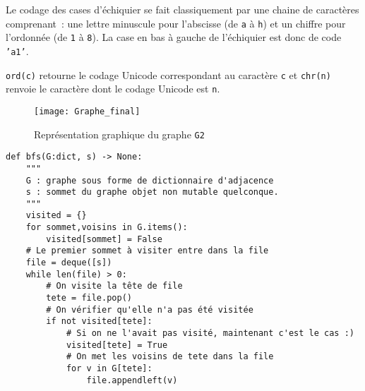 
Le codage des cases d'échiquier se fait classiquement par une chaine de caractères comprenant~: une lettre minuscule pour l'abscisse (de \texttt{a} à \texttt{h}) et un chiffre pour l'ordonnée (de \texttt{1} à \texttt{8}). La case en bas à gauche de l'échiquier est donc de code \texttt{'a1'}.

\begin{rem}
	\texttt{ord(c)} retourne le codage Unicode correspondant au caractère \texttt{c} et \texttt{chr(n)} renvoie le caractère dont le codage Unicode est \texttt{n}. 
\end{rem} 





\begin{figure}[h]
	\begin{center}
		\texttt{[image: Graphe\_final]}
	\end{center}
	\caption{Représentation graphique du graphe \texttt{G2}}
\end{figure}



\begin{lstlisting}
def bfs(G:dict, s) -> None:
    """
    G : graphe sous forme de dictionnaire d'adjacence
    s : sommet du graphe objet non mutable quelconque.
    """
    visited = {}
    for sommet,voisins in G.items():
        visited[sommet] = False
    # Le premier sommet à visiter entre dans la file
    file = deque([s])
    while len(file) > 0:
        # On visite la tête de file
        tete = file.pop()
        # On vérifier qu'elle n'a pas été visitée
        if not visited[tete]:
            # Si on ne l'avait pas visité, maintenant c'est le cas :)
            visited[tete] = True            
            # On met les voisins de tete dans la file
            for v in G[tete]:
                file.appendleft(v)
\end{lstlisting}

